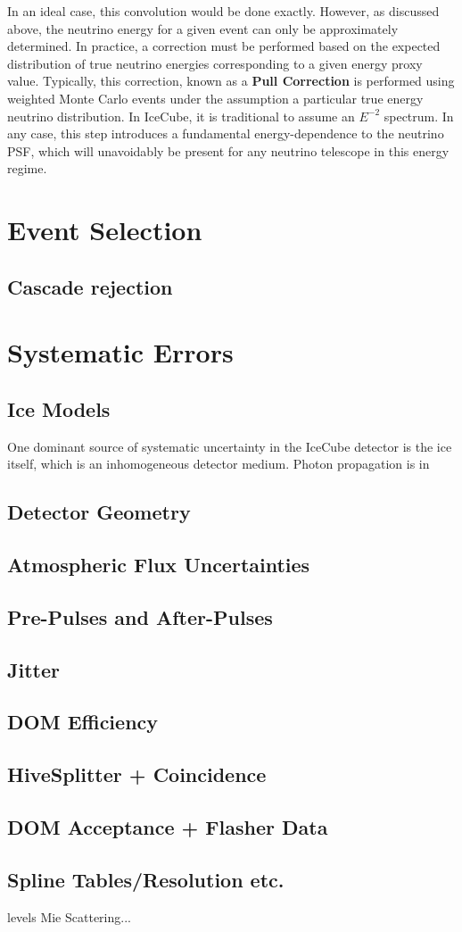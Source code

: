 In an ideal case, this convolution would be done exactly. However, as discussed above, the neutrino energy for a given event can only be approximately determined. In practice, a correction must be performed based on the expected distribution of true neutrino energies corresponding to a given energy proxy value. Typically, this correction, known as a \textbf{Pull Correction} is performed using weighted Monte Carlo events under the assumption a particular true energy neutrino distribution. In IceCube, it is traditional to assume an $E^{-2}$  spectrum. In any case, this step introduces a fundamental energy-dependence to the neutrino PSF, which will unavoidably be present for any neutrino telescope in this energy regime. 


\section{Event Selection}
\subsection{Cascade rejection}
\section{Systematic Errors}
\subsection{Ice Models}
One dominant source of systematic uncertainty in the IceCube detector is the ice itself, which is an inhomogeneous detector medium. Photon propagation is in
\subsection{Detector Geometry}
\subsection{Atmospheric Flux Uncertainties}
\subsection{Pre-Pulses and After-Pulses}
\subsection{Jitter}
\subsection{DOM Efficiency}
\subsection{HiveSplitter + Coincidence}
\subsection{DOM Acceptance + Flasher Data}
\subsection{Spline Tables/Resolution etc.}
levels
Mie Scattering...